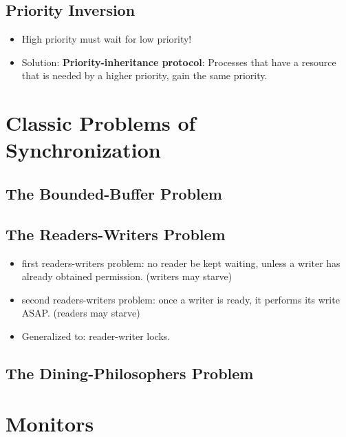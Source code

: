 \documentclass[10pt]{report}
\begin{document}
		\subsection{Priority Inversion}
			\begin{itemize}
				\item High priority must wait for low priority!
				\item Solution: \textbf{Priority-inheritance protocol}: Processes that have a resource that is needed by a higher priority, gain the same priority.
			\end{itemize}

	\section{Classic Problems of Synchronization}
		\subsection{The Bounded-Buffer Problem}

		\subsection{The Readers-Writers Problem}
			\begin{itemize}
				\item first readers-writers problem: no reader be kept waiting, unless a writer has already obtained permission. (writers may starve)
				\item second readers-writers problem: once a writer is ready, it performs its write ASAP. (readers may starve)
				\item Generalized to: reader-writer locks.
			\end{itemize}

		\subsection{The Dining-Philosophers Problem}

	\section{Monitors}
\end{document}
